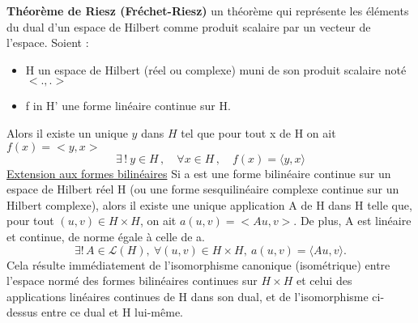 \documentclass{book}
\begin{document}
\textbf{Th\'eor\`eme de Riesz (Fr\'echet-Riesz)}\newline
un th\'eor\`eme qui repr\'esente les \'el\'ements du dual d'un espace de Hilbert comme produit scalaire par un vecteur de l'espace.
Soient :
\begin{itemize}
	\item H un espace de Hilbert (r\'eel ou complexe) muni de son produit scalaire not\'e $<.,.>$
	\item f in H' une forme lin\'eaire continue sur H.
\end{itemize}
Alors il existe un unique $y$ dans $H$ tel que pour tout x de H on ait $f(x) = <y, x>$
$$
\exists\,!\ y \in H\,, \quad \forall x\in H\,, \quad f(x) = \langle y,x\rangle
$$
\underline{Extension aux formes bilin\'eaires}\newline
Si a est une forme bilin\'eaire continue sur un espace de Hilbert r\'eel H (ou une forme sesquilin\'eaire complexe continue sur un Hilbert complexe), alors il existe une unique application A de H dans H telle que, pour tout $(u, v) \in H \times H$, on ait $a(u, v) = <Au, v>$. De plus, A est lin\'eaire et continue, de norme \'egale \`a celle de a.
$$
\exists !\,A\in\mathcal{L}(H),\ \forall (u,v)\in H\times H,\ a(u,v)=\langle Au,v \rangle.
$$
Cela r\'esulte imm\'ediatement de l'isomorphisme canonique (isom\'etrique) entre l'espace norm\'e des formes bilin\'eaires continues sur $H \times H$ et celui des applications lin\'eaires continues de H dans son dual, et de l'isomorphisme ci-dessus entre ce dual et H lui-m\^eme.
\bigskip
\end{document}
